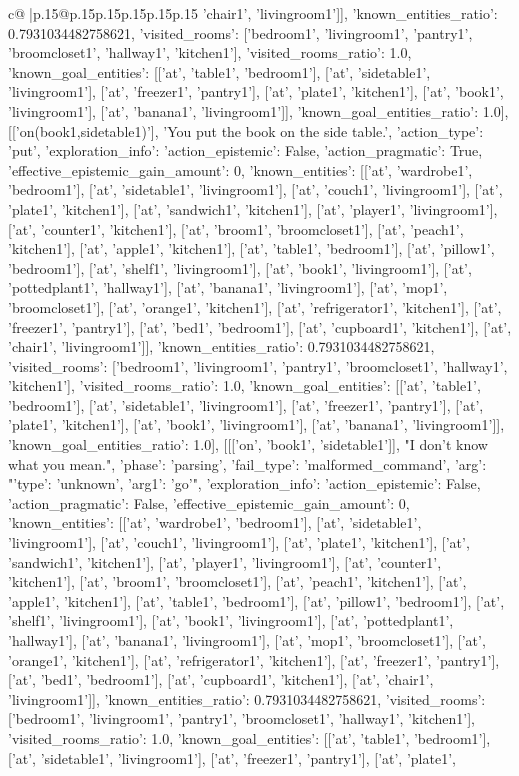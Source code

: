 \documentclass{article}
\begin{document}
{\begin{supertabular}{c@{$\;$}|p{.15\linewidth}@{}p{.15\linewidth}p{.15\linewidth}p{.15\linewidth}p{.15\linewidth}p{.15\linewidth}}
{{{'chair1', 'livingroom1']], 'known_entities_ratio': 0.7931034482758621, 'visited_rooms': ['bedroom1', 'livingroom1', 'pantry1', 'broomcloset1', 'hallway1', 'kitchen1'], 'visited_rooms_ratio': 1.0, 'known_goal_entities': [['at', 'table1', 'bedroom1'], ['at', 'sidetable1', 'livingroom1'], ['at', 'freezer1', 'pantry1'], ['at', 'plate1', 'kitchen1'], ['at', 'book1', 'livingroom1'], ['at', 'banana1', 'livingroom1']], 'known_goal_entities_ratio': 1.0}}], [['on(book1,sidetable1)'], 'You put the book on the side table.', {'action_type': 'put', 'exploration_info': {'action_epistemic': False, 'action_pragmatic': True, 'effective_epistemic_gain_amount': 0, 'known_entities': [['at', 'wardrobe1', 'bedroom1'], ['at', 'sidetable1', 'livingroom1'], ['at', 'couch1', 'livingroom1'], ['at', 'plate1', 'kitchen1'], ['at', 'sandwich1', 'kitchen1'], ['at', 'player1', 'livingroom1'], ['at', 'counter1', 'kitchen1'], ['at', 'broom1', 'broomcloset1'], ['at', 'peach1', 'kitchen1'], ['at', 'apple1', 'kitchen1'], ['at', 'table1', 'bedroom1'], ['at', 'pillow1', 'bedroom1'], ['at', 'shelf1', 'livingroom1'], ['at', 'book1', 'livingroom1'], ['at', 'pottedplant1', 'hallway1'], ['at', 'banana1', 'livingroom1'], ['at', 'mop1', 'broomcloset1'], ['at', 'orange1', 'kitchen1'], ['at', 'refrigerator1', 'kitchen1'], ['at', 'freezer1', 'pantry1'], ['at', 'bed1', 'bedroom1'], ['at', 'cupboard1', 'kitchen1'], ['at', 'chair1', 'livingroom1']], 'known_entities_ratio': 0.7931034482758621, 'visited_rooms': ['bedroom1', 'livingroom1', 'pantry1', 'broomcloset1', 'hallway1', 'kitchen1'], 'visited_rooms_ratio': 1.0, 'known_goal_entities': [['at', 'table1', 'bedroom1'], ['at', 'sidetable1', 'livingroom1'], ['at', 'freezer1', 'pantry1'], ['at', 'plate1', 'kitchen1'], ['at', 'book1', 'livingroom1'], ['at', 'banana1', 'livingroom1']], 'known_goal_entities_ratio': 1.0}}], [[['on', 'book1', 'sidetable1']], "I don't know what you mean.", {'phase': 'parsing', 'fail_type': 'malformed_command', 'arg': "{'type': 'unknown', 'arg1': 'go'}", 'exploration_info': {'action_epistemic': False, 'action_pragmatic': False, 'effective_epistemic_gain_amount': 0, 'known_entities': [['at', 'wardrobe1', 'bedroom1'], ['at', 'sidetable1', 'livingroom1'], ['at', 'couch1', 'livingroom1'], ['at', 'plate1', 'kitchen1'], ['at', 'sandwich1', 'kitchen1'], ['at', 'player1', 'livingroom1'], ['at', 'counter1', 'kitchen1'], ['at', 'broom1', 'broomcloset1'], ['at', 'peach1', 'kitchen1'], ['at', 'apple1', 'kitchen1'], ['at', 'table1', 'bedroom1'], ['at', 'pillow1', 'bedroom1'], ['at', 'shelf1', 'livingroom1'], ['at', 'book1', 'livingroom1'], ['at', 'pottedplant1', 'hallway1'], ['at', 'banana1', 'livingroom1'], ['at', 'mop1', 'broomcloset1'], ['at', 'orange1', 'kitchen1'], ['at', 'refrigerator1', 'kitchen1'], ['at', 'freezer1', 'pantry1'], ['at', 'bed1', 'bedroom1'], ['at', 'cupboard1', 'kitchen1'], ['at', 'chair1', 'livingroom1']], 'known_entities_ratio': 0.7931034482758621, 'visited_rooms': ['bedroom1', 'livingroom1', 'pantry1', 'broomcloset1', 'hallway1', 'kitchen1'], 'visited_rooms_ratio': 1.0, 'known_goal_entities': [['at', 'table1', 'bedroom1'], ['at', 'sidetable1', 'livingroom1'], ['at', 'freezer1', 'pantry1'], ['at', 'plate1', }}}
\end{supertabular}}
\end{document}
